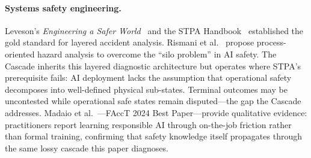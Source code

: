 \paragraph{Systems safety engineering.} Leveson's \textit{Engineering a Safer World}~\cite{leveson2012engineering} and the STPA Handbook~\cite{leveson2018stpa} established the gold standard for layered accident analysis. Rismani et al.~\cite{rismani2024silos} propose process-oriented hazard analysis to overcome the ``silo problem'' in AI safety. The Cascade inherits this layered diagnostic architecture but operates where STPA's prerequisite fails: AI deployment lacks the assumption that operational safety decomposes into well-defined physical sub-states. Terminal outcomes may be uncontested while operational safe states remain disputed---the gap the Cascade addresses. Madaio et al.~\cite{madaio2024rai}---FAccT 2024 Best Paper---provide qualitative evidence: practitioners report learning responsible AI through on-the-job friction rather than formal training, confirming that safety knowledge itself propagates through the same lossy cascade this paper diagnoses.

